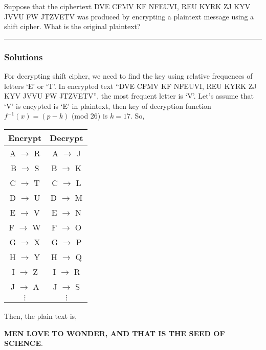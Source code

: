\newpage
\begin{question}
Suppose that the ciphertext DVE CFMV KF NFEUVI,
REU KYRK ZJ KYV JVVU FW JTZVETV was produced
by encrypting a plaintext message using a shift cipher.
What is the original plaintext?
\end{question}

\par\noindent\rule{\textwidth}{0.5pt}

\subsubsection*{Solutions}
\indent\indent
For decrypting shift cipher, we need to find the key using relative frequences of letters `E' or `T'. In encrypted text ``DVE CFMV KF NFEUVI,
REU KYRK ZJ KYV JVVU FW JTZVETV'', the most frequent letter is `V'. Let's assume that `V' is encypted is `E' in plaintext, then key of decryption function $f^{-1}(x) = (p-k)$ (mod 26) is $k = 17$. So,

\begin{tabular}{|c|c|}
    \hline
    Encrypt & Decrypt \\
    \hline
    A $\rightarrow$ R & A $\rightarrow$ J \\
    B $\rightarrow$ S & B $\rightarrow$ K \\
    C $\rightarrow$ T & C $\rightarrow$ L \\
    D $\rightarrow$ U & D $\rightarrow$ M \\
    E $\rightarrow$ V & E $\rightarrow$ N \\
    F $\rightarrow$ W & F $\rightarrow$ O \\
    G $\rightarrow$ X & G $\rightarrow$ P \\
    H $\rightarrow$ Y & H $\rightarrow$ Q \\
    I $\rightarrow$ Z & I $\rightarrow$ R \\
    J $\rightarrow$ A & J $\rightarrow$ S \\
    $\vdots$ & $\vdots$ \\
    \hline
\end{tabular}

\bigskip
Then, the plain text is,

\textbf{MEN LOVE TO WONDER, AND THAT IS THE SEED OF SCIENCE}.